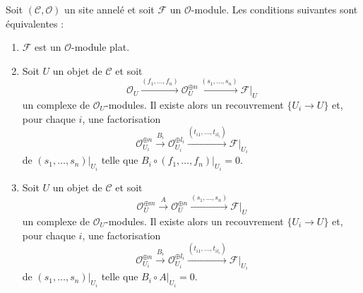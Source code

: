 \begin{lemma}

\label{lemma-flat-eq}

Soit $(\mathcal{C}, \mathcal{O})$ un site annelé et soit $\mathcal{F}$ un
$\mathcal{O}$-module. Les conditions suivantes sont équivalentes :

\begin{enumerate}

\item $\mathcal{F}$ est un $\mathcal{O}$-module plat.
\item Soit $U$ un objet de $\mathcal{C}$ et soit
$$
\mathcal{O}_U \xrightarrow{(f_1, \ldots, f_n)}
\mathcal{O}_U^{\oplus n} \xrightarrow{(s_1, \ldots, s_n)}
\mathcal{F}|_U
$$
un complexe de $\mathcal{O}_U$-modules. Il existe alors un recouvrement
$\{U_i \to U\}$ et, pour chaque $i$, une factorisation
$$
\mathcal{O}_{U_i}^{\oplus n}
\xrightarrow{B_i}
\mathcal{O}_{U_i}^{\oplus l_i} \xrightarrow{(t_{i1}, \ldots, t_{il_i})}
\mathcal{F}|_{U_i}
$$
de $(s_1, \ldots, s_n)|_{U_i}$ telle que
$B_i \circ (f_1, \ldots, f_n)|_{U_i} = 0$.
\item Soit $U$ un objet de $\mathcal{C}$ et soit
$$
\mathcal{O}_U^{\oplus m} \xrightarrow{A}
\mathcal{O}_U^{\oplus n} \xrightarrow{(s_1, \ldots, s_n)}
\mathcal{F}|_U
$$
un complexe de $\mathcal{O}_U$-modules. Il existe alors un recouvrement
$\{U_i \to U\}$ et, pour chaque $i$, une factorisation
$$
\mathcal{O}_{U_i}^{\oplus n}
\xrightarrow{B_i}
\mathcal{O}_{U_i}^{\oplus l_i} \xrightarrow{(t_{i1}, \ldots, t_{il_i})}
\mathcal{F}|_{U_i}
$$
de $(s_1, \ldots, s_n)|_{U_i}$ telle que
$B_i \circ A|_{U_i} = 0$.

\end{enumerate}

\end{lemma}

